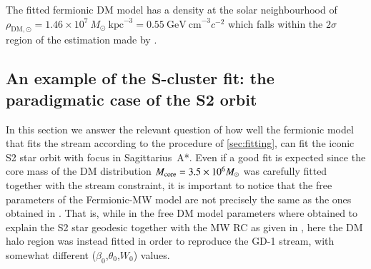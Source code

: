 \documentclass[twocolumn]{aa}
\begin{document}
The fitted fermionic DM model has a density at the solar neighbourhood of
$\rho_{\mathrm{DM},\odot}=1.46\times10^7~M_\odot~\mathrm{kpc}^{-3}=0.55~\mathrm{GeV~cm}^{-3} c^{-2}$ which falls within the $2\sigma$ region of the estimation made by \citet{Salucci2010}.

\subsection{An example of the S-cluster fit: the paradigmatic case of the S2 orbit}
In this section we answer the relevant question of how well the fermionic model that fits the stream according to the procedure of \cref{sec:fitting}, can fit the iconic S2 star orbit with focus in Sagittarius~A*. Even if a good fit is expected since the core mass of the DM distribution $M_{\rm{core}}=3.5\times 10^6 M_\odot$ was carefully fitted together with the stream constraint, it is important to notice that the free parameters of the Fermionic-MW model are not precisely the same as the ones obtained in \cite{2020A&A...641A..34B}. That is, while in \cite{2020A&A...641A..34B} the free DM model parameters where obtained to explain the S2 star geodesic together with the MW RC as given in \cite{sofue_rotation_2013}, here the DM halo region was instead fitted in order to reproduce the GD-1 stream, with somewhat different ($\beta_0$,$\theta_0$,$W_0$) values. 
\end{document}

